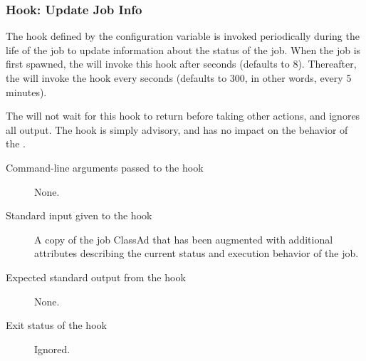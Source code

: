 \subsubsection{\label{sec:job-hooks-update-job-info}
Hook: Update Job Info}

The hook defined by the configuration variable
 is invoked periodically during the
life of the job to update information about the status of the job.
When the job is first spawned, the  will invoke this
hook after  seconds
(defaults to 8).
Thereafter, the  will invoke the hook every 
 seconds (defaults to 300,
in other words, every 5 minutes).

The  will not wait for this hook to return before
taking other actions, and ignores all output.
The hook is simply advisory, and has no impact on the behavior of the
.


\begin{description}
\item[Command-line arguments passed to the hook]
  None.

\item[Standard input given to the hook]
  A copy of the job ClassAd that has been augmented with additional
  attributes describing the current status and execution behavior of
  the job.

\item[Expected standard output from the hook]
  None.

\item[Exit status of the hook]
  Ignored.
\end{description}

